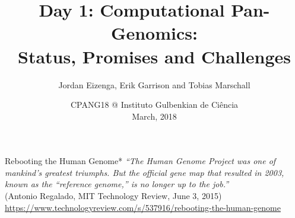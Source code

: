 \documentclass[notes=hide]{beamer}
\title{Day 1: Computational Pan-Genomics:\\Status, Promises and Challenges}
\author[TM]{Jordan Eizenga, Erik Garrison and Tobias Marschall}
\date{CPANG18 @ Instituto Gulbenkian de Ci\^{e}ncia\\ March, 2018}
\newcommand{\0}{\ensuremath{\mathtt{0}}}
\newcommand{\1}{\ensuremath{\mathtt{1}}}
\begin{document}
\frame[plain]{\titlepage}



\begin{frame}{Rebooting the Human Genome*}
\textit{"`The Human Genome Project was one of mankind’s greatest triumphs. But the official gene map that resulted in 2003, known as the “reference genome,” is no longer up to the job."'}\\[1em]
(Antonio Regalado, MIT Technology Review, June 3, 2015)\\[5em]

{\scriptsize *\url{https://www.technologyreview.com/s/537916/rebooting-the-human-genome}}
\end{frame}
\end{document}
